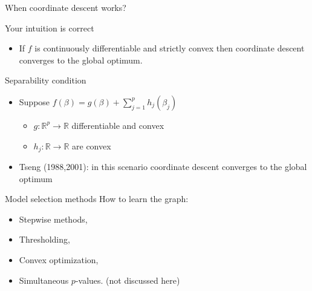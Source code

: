 \documentclass[dvipsnames,aspectratio=169]{beamer} %
\newcommand{\R}{\mathbb{R}}
\begin{document}
\begin{frame}{When coordinate descent works?}
\begin{alertblock}{Your intuition is correct}
	\begin{itemize}
		\item If $f$ is continuously differentiable and strictly convex  then coordinate descent converges to the global optimum.
	\end{itemize}
\end{alertblock}
\begin{alertblock}{Separability condition}
	\begin{itemize}
		\item Suppose $f(\beta)=g(\beta)+\sum_{j=1}^p h_j(\beta_j)$
		\begin{itemize}
		\item $g:\R^p\to \R$ differentiable and convex
		\item $h_j:\R\to\R$ are convex  
	\end{itemize}
	\item Tseng (1988,2001): in this scenario coordinate descent converges to the global optimum
	\end{itemize}
\end{alertblock}\end{frame}


%

\begin{frame}{Model selection methods}
How to learn the graph:\\[.4cm]
\begin{itemize}
	\item Stepwise methods,\\[.4cm]
	\item  Thresholding,\\[.4cm]
	\item Convex optimization,\\[.4cm]
	\item Simultaneous $p$-values.  (not discussed here)
\end{itemize}	
\end{frame}
\end{document}

